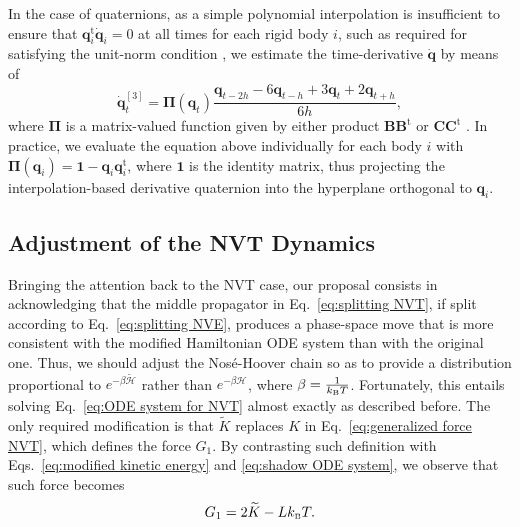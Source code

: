 \documentclass[
journal=jctcce,
layout=twocolumn
]{achemso}
\newcommand{\mt}[1]{\boldsymbol{\mathbf{#1}}}   %
\newcommand{\vt}[1]{\boldsymbol{\mathbf{#1}}}   %
\newcommand{\tr}[1]{#1^\text{t}}                %
\newcommand{\Ham}[1]{{\mathcal H}_\text{#1}}    %
\newcommand{\timestep}{h}
\newcommand{\modified}[1]{\widetilde{#1}}
\begin{document}
In the case of quaternions, as a simple polynomial interpolation is insufficient to ensure that $\tr{\vt q}_i \dot{\vt q}_i = 0$ at all times for each rigid body $i$, such as required for satisfying the unit-norm condition \cite{Silveira_2017}, we estimate the time-derivative $\dot{\vt q}$ by means of\cite{Schay_1995}
\begin{equation*}
\dot{\vt q}^{[3]}_t = {\mt \Pi}({\vt q}_t) \frac{{\vt q}_{t-2\timestep} - 6 {\vt q}_{t-\timestep} + 3 {\vt q}_t + 2 {\vt q}_{t+\timestep}}{6\timestep},
\end{equation*}
where ${\mt \Pi}$ is a matrix-valued function given by either product ${\mt B}\tr{\mt B}$ or ${\mt C}\tr{\mt C}$ \cite{Silveira_2017}.
In practice, we evaluate the equation above individually for each body $i$ with ${\mt \Pi}({\vt q}_i) = {\mt 1} - {\vt q}_i \tr{\vt q}_i$, where $\mt 1$ is the identity matrix, thus projecting the interpolation-based derivative quaternion into the hyperplane orthogonal to ${\vt q}_i$.

\subsection{Adjustment of the NVT Dynamics}

Bringing the attention back to the NVT case, our proposal consists in acknowledging that the middle propagator in Eq.~\eqref{eq:splitting NVT}, if split according to Eq.~\eqref{eq:splitting NVE}, produces a phase-space move that is more consistent with the modified Hamiltonian ODE system than with the original one.
Thus, we should adjust the Nos\'e-Hoover chain so as to provide a distribution proportional to $e^{-\beta \modified{\Ham{}}}$ rather than $e^{-\beta \Ham{}}$, where $\beta = \frac{1}{k_\text{\tiny B} T}$.
Fortunately, this entails solving Eq.~\eqref{eq:ODE system for NVT} almost exactly as described before.
The only required modification is that $\modified K$ replaces $K$ in Eq.~\eqref{eq:generalized force NVT}, which defines the force $G_1$.
By contrasting such definition with Eqs.~\eqref{eq:modified kinetic energy} and \eqref{eq:shadow ODE system}, we observe that such force becomes
\begin{equation}
G_1 = 2 \modified K - L k_\text{\tiny B} T.
\end{equation}
\end{document}
